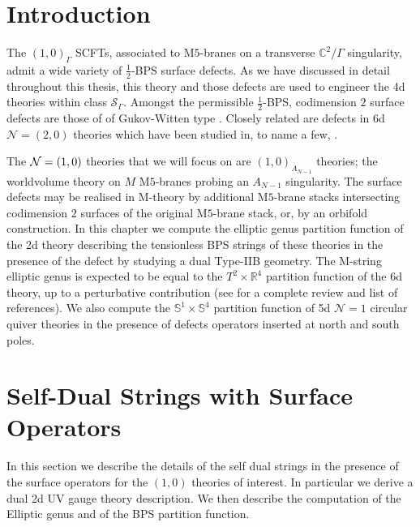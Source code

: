 \documentclass[main.tex]{subfiles}
\begin{document}
 
\section{Introduction}
The $(1,0)_{\Gamma}$ SCFTs, associated to M$5$-branes on a transverse $\mathbb{C}^2/\Gamma$ singularity, admit a wide variety of $\frac{1}{2}$-BPS surface defects. As we have discussed in detail throughout this thesis, this theory and those defects are used to engineer the 4d theories within class $\mathcal{S}_{\Gamma}$. 
Amongst the permissible $\frac{1}{2}$-BPS, codimension $2$ surface defects are those of of Gukov-Witten type \cite{Gukov:2008sn,Gaiotto:2009hg,Gaiotto:2009we}. 
Closely related are defects in 6d $\mathcal{N}=(2,0)$ theories which have been studied in, to name a few, \cite{Chacaltana:2012zy,Bullimore:2014awa,Tachikawa:2011dz,Beem:2014kka,Gaiotto:2009hg,Bullimore:2014upa}.

The $\mathcal{N}=(1,0)$ theories that we will focus on are $(1,0)_{A_{N-1}}$ theories; the worldvolume theory on $M$ M$5$-branes probing an $A_{N-1}$ singularity. The surface defects may be realised in M-theory by additional M$5$-brane stacks intersecting codimension $2$ surfaces of the original M$5$-brane stack, or, by an orbifold construction. In this chapter we compute the elliptic genus partition function of the 2d theory describing the tensionless BPS strings of these theories in the presence of the defect by studying a dual Type-IIB geometry. The M-string elliptic genus is expected to be equal to the $T^2\times \mathbb{R}^4$ partition function of the 6d theory, up to a perturbative contribution (see \cite{del2018universal} for a complete review and list of references). We also compute the $\mathbb{S}^1\times \mathbb{S}^4$ partition function of 5d $\mathcal{N}=1$ circular quiver theories in the presence of defects operators inserted at north and south poles.

\section{Self-Dual Strings with Surface Operators}\label{sec:ADE}
In this section we describe the details of the self dual strings in the presence of the surface operators for the $(1,0)$ theories of interest. In particular we derive a dual 2d UV gauge theory description. We then describe the computation of the Elliptic genus and of the BPS partition function.
\end{document}
